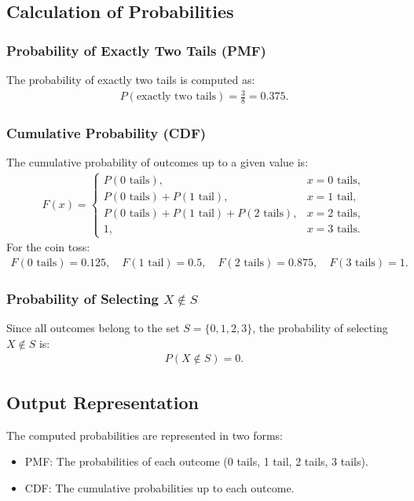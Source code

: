 \documentclass[journal]{IEEEtran}
\begin{document}
\subsection*{Calculation of Probabilities}
\subsubsection*{Probability of Exactly Two Tails (PMF)}
The probability of exactly two tails is computed as:
\begin{align}
P(\text{exactly two tails}) = \frac{3}{8} = 0.375.
\end{align}

\subsubsection*{Cumulative Probability (CDF)}
The cumulative probability of outcomes up to a given value is:
\begin{align}
F(x) = 
\begin{cases} 
P(0 \text{ tails}), & x = 0 \text{ tails}, \\
P(0 \text{ tails}) + P(1 \text{ tail}), & x = 1 \text{ tail}, \\
P(0 \text{ tails}) + P(1 \text{ tail}) + P(2 \text{ tails}), & x = 2 \text{ tails}, \\
1, & x = 3 \text{ tails}.
\end{cases}
\end{align}
For the coin toss:
\begin{align}
F(0 \text{ tails}) = 0.125, \quad F(1 \text{ tail}) = 0.5, \quad F(2 \text{ tails}) = 0.875, \quad F(3 \text{ tails}) = 1.
\end{align}

\subsubsection*{Probability of Selecting \( X \notin S \)}
Since all outcomes belong to the set \( S = \{0, 1, 2, 3\}\), the probability of selecting \( X \notin S \) is:
\begin{align}
P(X \notin S) = 0.
\end{align}

\subsection*{Output Representation}
The computed probabilities are represented in two forms:
\begin{itemize}
    \item PMF: The probabilities of each outcome (0 tails, 1 tail, 2 tails, 3 tails).
    \item CDF: The cumulative probabilities up to each outcome.
\end{itemize}
\end{document}
